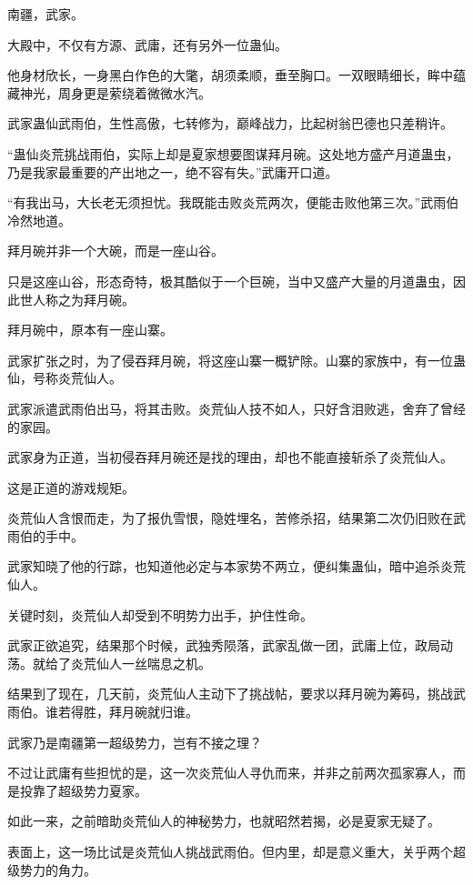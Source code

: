 
\begin{this_body}

南疆，武家。

大殿中，不仅有方源、武庸，还有另外一位蛊仙。

他身材欣长，一身黑白作色的大氅，胡须柔顺，垂至胸口。一双眼睛细长，眸中蕴藏神光，周身更是萦绕着微微水汽。

武家蛊仙武雨伯，生性高傲，七转修为，巅峰战力，比起树翁巴德也只差稍许。

“蛊仙炎荒挑战雨伯，实际上却是夏家想要图谋拜月碗。这处地方盛产月道蛊虫，乃是我家最重要的产出地之一，绝不容有失。”武庸开口道。

“有我出马，大长老无须担忧。我既能击败炎荒两次，便能击败他第三次。”武雨伯冷然地道。

拜月碗并非一个大碗，而是一座山谷。

只是这座山谷，形态奇特，极其酷似于一个巨碗，当中又盛产大量的月道蛊虫，因此世人称之为拜月碗。

拜月碗中，原本有一座山寨。

武家扩张之时，为了侵吞拜月碗，将这座山寨一概铲除。山寨的家族中，有一位蛊仙，号称炎荒仙人。

武家派遣武雨伯出马，将其击败。炎荒仙人技不如人，只好含泪败逃，舍弃了曾经的家园。

武家身为正道，当初侵吞拜月碗还是找的理由，却也不能直接斩杀了炎荒仙人。

这是正道的游戏规矩。

炎荒仙人含恨而走，为了报仇雪恨，隐姓埋名，苦修杀招，结果第二次仍旧败在武雨伯的手中。

武家知晓了他的行踪，也知道他必定与本家势不两立，便纠集蛊仙，暗中追杀炎荒仙人。

关键时刻，炎荒仙人却受到不明势力出手，护住性命。

武家正欲追究，结果那个时候，武独秀陨落，武家乱做一团，武庸上位，政局动荡。就给了炎荒仙人一丝喘息之机。

结果到了现在，几天前，炎荒仙人主动下了挑战帖，要求以拜月碗为筹码，挑战武雨伯。谁若得胜，拜月碗就归谁。

武家乃是南疆第一超级势力，岂有不接之理？

不过让武庸有些担忧的是，这一次炎荒仙人寻仇而来，并非之前两次孤家寡人，而是投靠了超级势力夏家。

如此一来，之前暗助炎荒仙人的神秘势力，也就昭然若揭，必是夏家无疑了。

表面上，这一场比试是炎荒仙人挑战武雨伯。但内里，却是意义重大，关乎两个超级势力的角力。


\end{this_body}
